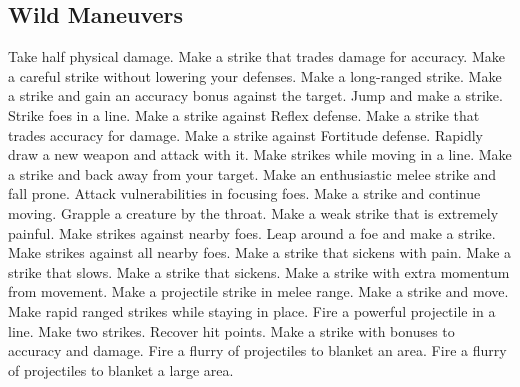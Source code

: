 \subsection{Wild Maneuvers}\label{Wild Maneuvers}
\begin{spelllist}
 Take half physical damage.
 Make a strike that trades damage for accuracy.
 Make a careful strike without lowering your defenses.
 Make a long-ranged strike.
 Make a strike and gain an accuracy bonus against the target.
 Jump and make a strike.
 Strike foes in a line.
 Make a strike against Reflex defense.
 Make a strike that trades accuracy for damage.
 Make a strike against Fortitude defense.
 Rapidly draw a new weapon and attack with it.
 Make strikes while moving in a line.
 Make a strike and back away from your target.
 Make an enthusiastic melee strike and fall prone.
 Attack vulnerabilities in focusing foes.
 Make a strike and continue moving.
 Grapple a creature by the throat.
 Make a weak strike that is extremely painful.
 Make strikes against nearby foes.
 Leap around a foe and make a strike.
 Make strikes against all nearby foes.
 Make a strike that sickens with pain.
 Make a strike that slows.
 Make a strike that sickens.
 Make a strike with extra momentum from movement.
 Make a projectile strike in melee range.
 Make a strike and move.
 Make rapid ranged strikes while staying in place.
 Fire a powerful projectile in a line.
 Make two strikes.
 Recover hit points.
 Make a strike with bonuses to accuracy and damage.
 Fire a flurry of projectiles to blanket an area.
 Fire a flurry of projectiles to blanket a large area.
\end{spelllist}
